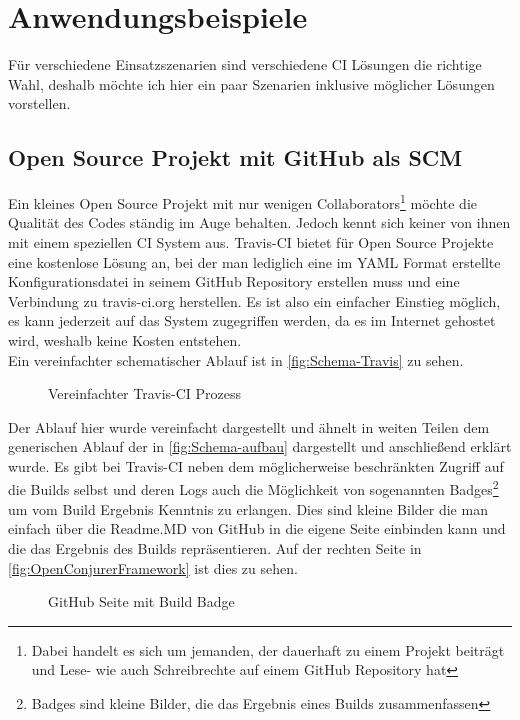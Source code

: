 \pagebreak

\chapter{Anwendungsbeispiele}
Für verschiedene Einsatzszenarien sind verschiedene CI Lösungen die richtige Wahl, deshalb möchte ich hier ein paar Szenarien inklusive möglicher Lösungen vorstellen.
\section{Open Source Projekt mit GitHub als SCM}
Ein kleines Open Source Projekt mit nur wenigen Collaborators\footnote{Dabei handelt es sich um jemanden, der dauerhaft zu einem Projekt beiträgt und Lese- wie auch Schreibrechte auf einem GitHub Repository hat} möchte die Qualität des Codes ständig im Auge behalten. Jedoch kennt sich keiner von ihnen mit einem speziellen CI System aus. Travis-CI bietet für Open Source Projekte eine kostenlose Lösung an, bei der man lediglich eine im YAML Format erstellte Konfigurationsdatei in seinem GitHub Repository erstellen muss und eine Verbindung zu travis-ci.org herstellen. Es ist also ein einfacher Einstieg möglich, es kann jederzeit auf das System zugegriffen werden, da es im Internet gehostet wird, weshalb keine Kosten entstehen.\\
Ein vereinfachter schematischer Ablauf ist in \autoref{fig:Schema-Travis} zu sehen.
\begin{figure}[H]
  \centering
  \caption{Vereinfachter Travis-CI Prozess}\label{fig:Schema-Travis}
\end{figure}
Der Ablauf hier wurde vereinfacht dargestellt und ähnelt in weiten Teilen dem generischen Ablauf der in \autoref{fig:Schema-aufbau} dargestellt und anschließend erklärt wurde. Es gibt bei Travis-CI neben dem möglicherweise beschränkten Zugriff auf die Builds selbst und deren Logs auch die Möglichkeit von sogenannten Badges\footnote{Badges sind kleine Bilder, die das Ergebnis eines Builds zusammenfassen} um vom Build Ergebnis Kenntnis zu erlangen. Dies sind kleine Bilder die man einfach über die Readme.MD von GitHub in die eigene Seite einbinden kann und die das Ergebnis des Builds repräsentieren. Auf der rechten Seite in \autoref{fig:OpenConjurerFramework} ist dies zu sehen.
\begin{figure}[H]
  \centering
  \caption{GitHub Seite mit Build Badge}\label{fig:OpenConjurerFramework}
\end{figure}
